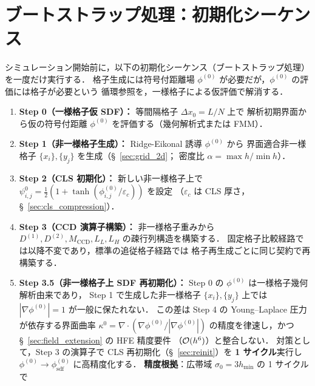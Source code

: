 
\section{ブートストラップ処理：初期化シーケンス}
\label{app:bootstrap}

シミュレーション開始前に，以下の初期化シーケンス（ブートストラップ処理）を一度だけ実行する．
格子生成には符号付距離場 $\phi^{(0)}$ が必要だが，$\phi^{(0)}$ の評価には格子が必要という
循環参照を，一様格子による仮評価で解消する．

\begin{tcolorbox}[algbox, title={ブートストラップ処理：初期化シーケンス（6 段階）}]
\begin{enumerate}
  \item \textbf{Step 0（一様格子仮 SDF）：} 等間隔格子 $\Delta x_0 = L/N$ 上で
        解析初期界面から仮の符号付距離 $\phi^{(0)}$ を評価する（幾何解析式または FMM）．
  \item \textbf{Step 1（非一様格子生成）：} Ridge-Eikonal 誘導 $\phi^{(0)}$ から
        界面適合非一様格子 $\{x_i\}, \{y_j\}$ を生成（§~\ref{sec:grid_2d}；
        密度比 $\alpha = \max h / \min h$）．
  \item \textbf{Step 2（CLS 初期化）：} 新しい非一様格子上で
        $\psi^0_{i,j} = \tfrac{1}{2}(1+\tanh(\phi^{(0)}_{i,j}/\varepsilon_c))$ を設定
        （$\varepsilon_c$ は CLS 厚さ，§~\ref{sec:cls_compression}）．
  \item \textbf{Step 3（CCD 演算子構築）：} 非一様格子重みから
        $D^{(1)}, D^{(2)}, M_{\mathrm{CCD}}, L_L, L_H$ の疎行列構造を構築する．
        固定格子比較経路では以降不変であり，標準の追従格子経路では
        格子再生成ごとに同じ契約で再構築する．
  \item \textbf{Step 3.5（非一様格子上 SDF 再初期化）：}
        Step 0 の $\phi^{(0)}$ は一様格子幾何解析由来であり，
        Step 1 で生成した非一様格子 $\{x_i\},\{y_j\}$ 上では
        $|\nabla\phi^{(0)}|=1$ が一般に保たれない．
        この差は Step 4 の Young--Laplace 圧力が依存する界面曲率
        $\kappa^0=\nabla\!\cdot\!(\nabla\phi^{(0)}/|\nabla\phi^{(0)}|)$
        の精度を律速し，かつ §~\ref{sec:field_extension} の HFE 精度要件
        （$\mathcal{O}(h^6)$）と整合しない．
        対策として，Step 3 の演算子で CLS 再初期化（§~\ref{sec:reinit}）を
        \textbf{1 サイクル}実行し
        $\phi^{(0)}\to\phi^{(0)}_\text{sdf}$ に高精度化する．
        \textbf{精度根拠}：広帯域 $\sigma_0 = 3 h_{\min}$ の 1 サイクルで

\end{enumerate}
\end{tcolorbox}
